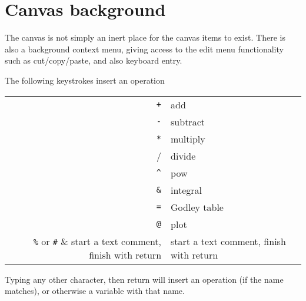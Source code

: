 \section{Canvas background}

The canvas is not simply an inert place for the canvas items to
exist. There is also a background context menu, giving access to the
edit menu functionality such as cut/copy/paste, and also keyboard entry.

The following keystrokes insert an operation

\begin{tabular}{rl}
\verb-+- & add\\
\verb+-+ & subtract \\
\verb+*+ & multiply\\
\verb++/ & divide\\
\verb+^+ & pow\\
\verb+&+ & integral\\
\verb+=+ & Godley table\\
\verb+@+ & plot\\
\verb+%+ or \verb+#+ & start a text comment, finish with return\\
\end{tabular}

Typing any other character, then return will insert an operation (if
the name matches), or otherwise a variable with that name.
